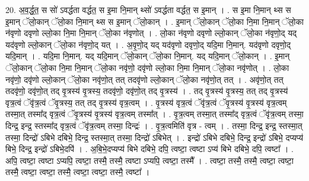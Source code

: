 \documentclass[17pt]{extarticle}
\begin{document}
20. अ॒व॒र्द्ध॒त॒ स सो॑ ऽवर्द्धता वर्द्धत॒ स इ॒मा नि॒मान् थ्सो॑ ऽवर्द्धता वर्द्धत॒ स इ॒मान् । . स इ॒मा नि॒मान् थ्स स इ॒मान् ॅलो॒कान् ॅलो॒का नि॒मान् थ्स स इ॒मान् ॅलो॒कान् । . इ॒मान् ॅलो॒कान् ॅलो॒का नि॒मा नि॒मान् ॅलो॒का न॑वृणो दवृणो ल्लो॒का नि॒मा नि॒मान् ॅलो॒का न॑वृणोत् । . लो॒का न॑वृणो दवृणो ल्लो॒कान् ॅलो॒का न॑वृणो॒द् यद् यद॑वृणो ल्लो॒कान् ॅलो॒का न॑वृणो॒द् यत् । . अ॒वृ॒णो॒द् यद् यद॑वृणो दवृणो॒द् यदि॒मा नि॒मान्. यद॑वृणो दवृणो॒द् यदि॒मान् । . यदि॒मा नि॒मान्. यद् यदि॒मान् ॅलो॒कान् ॅलो॒का नि॒मान्. यद् यदि॒मान् ॅलो॒कान् । . इ॒मान् ॅलो॒कान् ॅलो॒का नि॒मा नि॒मान् ॅलो॒का नवृ॑णो॒ दवृ॑णो ल्लो॒का नि॒मा नि॒मान् ॅलो॒का नवृ॑णोत् । . लो॒का नवृ॑णो॒ दवृ॑णो ल्लो॒कान् ॅलो॒का नवृ॑णो॒त् तत् तदवृ॑णो ल्लो॒कान् ॅलो॒का नवृ॑णो॒त् तत् । . अवृ॑णो॒त् तत् तदवृ॑णो॒ दवृ॑णो॒त् तद् वृ॒त्रस्य॑ वृ॒त्रस्य॒ तदवृ॑णो॒ दवृ॑णो॒त् तद् वृ॒त्रस्य॑ । . तद् वृ॒त्रस्य॑ वृ॒त्रस्य॒ तत् तद् वृ॒त्रस्य॑ वृत्र॒त्वं ॅवृ॑त्र॒त्वं ॅवृ॒त्रस्य॒ तत् तद् वृ॒त्रस्य॑ वृत्र॒त्वम् । . वृ॒त्रस्य॑ वृत्र॒त्वं ॅवृ॑त्र॒त्वं ॅवृ॒त्रस्य॑ वृ॒त्रस्य॑ वृत्र॒त्वम् तस्मा॒त् तस्मा᳚द् वृत्र॒त्वं ॅवृ॒त्रस्य॑ वृ॒त्रस्य॑ वृत्र॒त्वम् तस्मा᳚त् । . वृ॒त्र॒त्वम् तस्मा॒त् तस्मा᳚द् वृत्र॒त्वं ॅवृ॑त्र॒त्वम् तस्मा॒ दिन्द्र॒ इन्द्र॒ स्तस्मा᳚द् वृत्र॒त्वं ॅवृ॑त्र॒त्वम् तस्मा॒ दिन्द्रः॑ । . वृ॒त्र॒त्वमिति॑ वृत्र - त्वम् । . तस्मा॒ दिन्द्र॒ इन्द्र॒ स्तस्मा॒त् तस्मा॒ दिन्द्रो॑ ऽबिभे दबिभे॒ दिन्द्र॒ स्तस्मा॒त् तस्मा॒ दिन्द्रो॑ ऽबिभेत् । . इन्द्रो॑ ऽबिभे दबिभे॒ दिन्द्र॒ इन्द्रो॑ ऽबिभे॒ दप्यप्य॑ बिभे॒ दिन्द्र॒ इन्द्रो॑ ऽबिभे॒दपि॑ । . अ॒बि॒भे॒दप्यप्य॑ बिभे दबिभे॒ दपि॒ त्वष्टा॒ त्वष्टा ऽप्य॑ बिभे दबिभे॒ दपि॒ त्वष्टा᳚ । . अपि॒ त्वष्टा॒ त्वष्टा ऽप्यपि॒ त्वष्टा॒ तस्मै॒ तस्मै॒ त्वष्टा ऽप्यपि॒ त्वष्टा॒ तस्मै᳚ । . त्वष्टा॒ तस्मै॒ तस्मै॒ त्वष्टा॒ त्वष्टा॒ तस्मै॒ त्वष्टा॒ त्वष्टा॒ तस्मै॒ त्वष्टा॒ त्वष्टा॒ तस्मै॒ त्वष्टा᳚ । \newline
\end{document}
